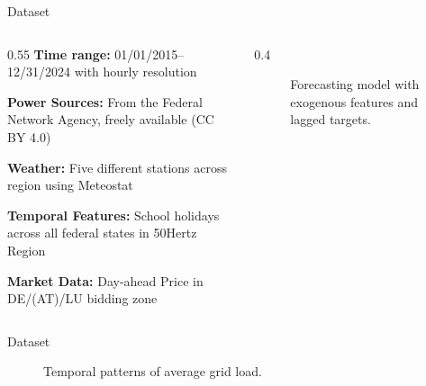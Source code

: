 \documentclass[10pt, aspectratio=169]{beamer}
\begin{document}
\begin{frame}{Dataset}
    \begin{columns}[onlytextwidth]
        \begin{column}{0.55\textwidth}
            \textbf{Time range:} 01/01/2015--12/31/2024 with hourly resolution
    
            \textbf{Power Sources:} From the Federal Network Agency, freely available (CC BY 4.0)~\cite{bundesnetzagentur_2025_smard}

            \textbf{Weather:} Five different stations across region using Meteostat~\cite{lamprecht_2025_meteostat}
            
            \textbf{Temporal Features:} School holidays across all federal states in 50Hertz Region~\cite{johannsen_2025_schulferien}

            \textbf{Market Data:} Day-ahead Price in DE/(AT)/LU bidding zone~\cite{burger_2025_energy-charts}
        \end{column}
        
        \begin{column}{0.4\textwidth}
            \centering
            \begin{figure}
                \centering
                
                \caption{Forecasting model with exogenous features and lagged targets.}
                \label{fig:model_structure}
            \end{figure}
        \end{column}
    \end{columns}
\end{frame}

\begin{frame}{Dataset}
    \begin{figure}
        \centering
        
        \caption{Temporal patterns of average grid load.}
        \label{fig:average_load}
    \end{figure}
\end{frame}
\end{document}
